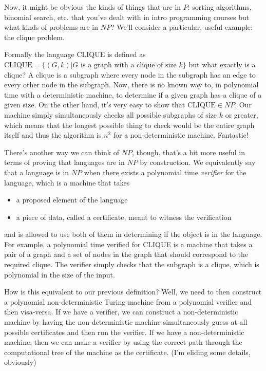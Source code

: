\documentclass[11pt]{article}
\begin{document}
Now, it might be obvious the kinds of things that are in $P$: sorting algorithms, binomial search, etc. that you've dealt with in intro programming courses but what kinds of problems are in $NP$? We'll consider a particular, useful example: the clique problem. 

Formally the language CLIQUE is defined as $\text{CLIQUE} = \{(G,k) | G \text{ is a graph with a clique of size } k\}$ but what exactly is a clique? A clique is a subgraph where every node in the subgraph has an edge to every other node in the subgraph. Now, there is no known way to, in polynomial time with a deterministic machine, to determine if a given graph has a clique of a given size. On the other hand, it's very easy to show that $\text{CLIQUE} \in NP$. Our machine simply simultaneously checks all possible subgraphs of size $k$ or greater, which means that the longest possible thing to check would be the entire graph itself and thus the algorithm is $n^2$ for a non-deterministic machine. Fantastic!

There's another way we can think of $NP$, though, that's a bit more useful in terms of proving that languages are in $NP$ by construction. We equivalently say that a language is in $NP$ when there exists a polynomial time \emph{verifier} for the language, which is a machine that takes 
\begin{itemize}
\item a proposed element of the language
\item a piece of data, called a certificate, meant to witness the verification
\end{itemize}
and is allowed to use both of them in determining if the object is in the language. For example, a polynomial time verified for CLIQUE is a machine that takes a pair of a graph and a set of nodes in the graph that should correspond to the required clique. The verifier simply checks that the subgraph is a clique, which is polynomial in the size of the input.

How is this equivalent to our previous definition? Well, we need to then construct a polynomial non-deterministic Turing machine from a polynomial verifier and then visa-versa. If we have a verifier, we can construct a non-deterministic machine by having the non-deterministic machine simultaneously guess at all possible certificates and then run the verifier. If we have a non-deterministic machine, then we can make a verifier by using the correct path through the computational tree of the machine as the certificate. (I'm eliding some details, obviously)
\end{document}
